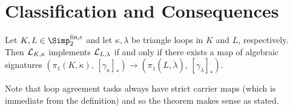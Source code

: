 \section{Classification and Consequences}
\label{ch2:sec:consequences}
%
\begingroup{}
\begin{thTheorem}
    \label{ch3:classification}
    Let $K,L\in\finSimp$ and let $\kappa,\lambda$ be triangle loops
    in $K$ and $L$, respectively.
    Then $\mathcal{L}_{K,\kappa}$ implements $\mathcal{L}_{L,\lambda}$ if and only if
    there exists a map of algebraic signatures
    $( \pi_1(K,\dot\kappa), \, [\gamma_\kappa]_\ast )
        \to ( \pi_1(L,\dot\lambda), \, [\gamma_\lambda]_\ast )$.
\end{thTheorem}
\endgroup

Note that loop agreement tasks always have strict carrier maps (which
is immediate from the definition) and so the theorem makes sense as stated.

